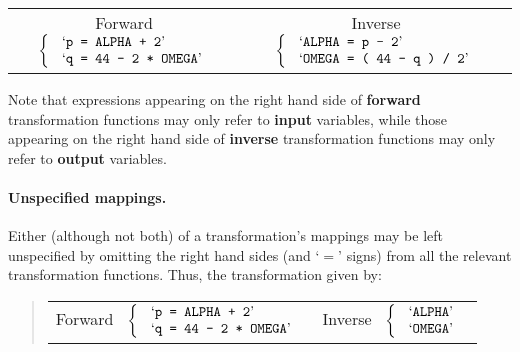 \documentclass[twoside,11pt]{article}
\renewcommand{\_}{\texttt{\symbol{95}}}
\begin{document}
\begin{center}
\begin{tabular}{cc}

\mbox{Forward } $\left\{ \mbox{
\begin{tabular}{l}
`\texttt{p = ALPHA + 2}' \\
`\texttt{q = 44 - 2 * OMEGA}' \\
\end{tabular}
}\right.$
&
\mbox{Inverse } $\left\{ \mbox{
\begin{tabular}{l}
`\texttt{ALPHA = p - 2}' \\
`\texttt{OMEGA = ( 44 - q ) / 2}'
\end{tabular}
}\right.$

\end{tabular}
\end{center}

Note that expressions appearing on the right hand side of \textbf{forward}
transformation functions may only refer to \textbf{input} variables, while
those appearing on the right hand side of \textbf{inverse} transformation
functions may only refer to \textbf{output} variables.

\paragraph{Unspecified mappings.}
Either (although not both) of a transformation's mappings may be left
unspecified by omitting the right hand sides (and `$=$' signs) from all the
relevant transformation functions.
Thus, the transformation given by:

\begin{quote}
\begin{center}
\begin{tabular}{cc}

\mbox{Forward } $\left\{ \mbox{
\begin{tabular}{l}
`\texttt{p = ALPHA + 2}' \\
`\texttt{q = 44 - 2 * OMEGA}' \\
\end{tabular}
}\right.$
&
\mbox{Inverse } $\left\{ \mbox{
\begin{tabular}{l}
`\texttt{ALPHA}' \\
`\texttt{OMEGA}'
\end{tabular}
}\right.$

\end{tabular}
\end{center}
\end{quote}
\end{document}
